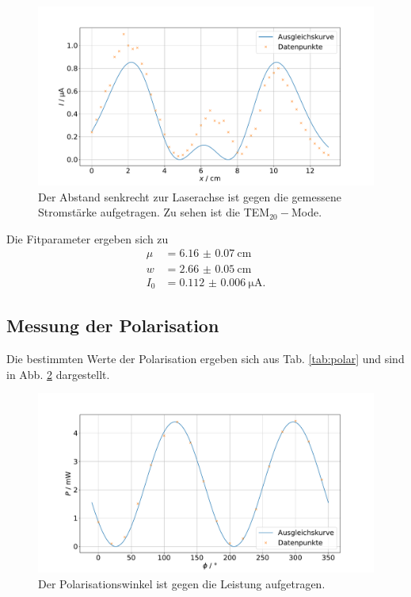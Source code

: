 \begin{figure}
    \centering
    \includegraphics[width=15cm]{plots/mode2.pdf}
    \caption{Der Abstand senkrecht zur Laserachse ist gegen die gemessene Stromstärke aufgetragen. Zu sehen ist die TEM$_{20}-$Mode.}
    \label{fig:mode2}
\end{figure}

Die Fitparameter ergeben sich zu 
\begin{align*}
    \mu &= \SI{6.16(7)}{\centi\meter} \\
    w &= \SI{2.66(5)}{\centi\meter} \\ 
    I_0 &= \SI{0.112(6)}{\micro\ampere}.
\end{align*}

\subsection{Messung der Polarisation}

Die bestimmten Werte der Polarisation ergeben sich aus Tab. \ref{tab:polar} und sind in Abb. \ref{fig:polarisation} dargestellt. 


\begin{figure}
    \centering
    \includegraphics[width=15cm]{plots/polarisation.pdf}
    \caption{Der Polarisationswinkel ist gegen die Leistung aufgetragen.}
    \label{fig:polarisation}
\end{figure}    

